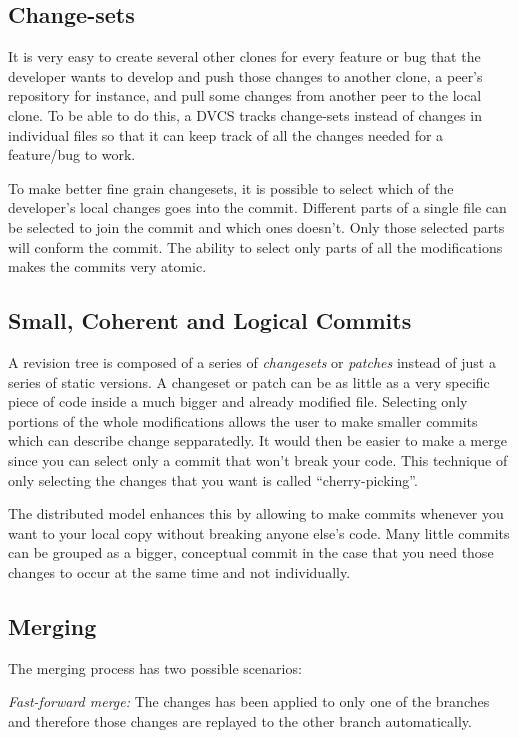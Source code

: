 \documentclass[a4paper,10pt]{article}
\begin{document}
\subsection{Change-sets}
It is very easy to create several other clones for every feature or bug that the developer wants to develop and push those changes to another clone, a peer's repository for instance, and pull some changes from another peer to the local clone. To be able to do this, a DVCS tracks change-sets instead of changes in individual files so that it can keep track of all the changes needed for a feature/bug to work.

To make better fine grain changesets, it is possible to select which of the developer's local changes goes into the commit.
Different parts of a single file can be selected to join the commit and which ones doesn't. 
Only those selected parts will conform the commit. The ability to select only parts of all the modifications makes the commits very atomic.


\subsection{Small, Coherent and Logical Commits}
A revision tree is composed of a series of \emph{changesets} or \emph{patches} instead of just a series of static versions. A changeset or patch
can be as little as a very specific piece of code inside a much bigger and already modified file. Selecting only portions of the whole modifications
allows the user to make smaller commits which can describe change sepparatedly. It would then be easier to make a merge since you can select
only a commit that won't break your code. This technique of only selecting the changes that you want is called ``cherry-picking''.

The distributed model enhances this by allowing to make commits whenever you want to your local copy without breaking anyone else's code. Many little commits can be grouped as a bigger, conceptual commit in the case that you need those changes to occur at the same time and not individually. 

\subsection{Merging}
The merging process has two possible scenarios:

\emph{Fast-forward merge:} The changes has been applied to only one of the branches and therefore those changes are replayed to the other branch automatically.
\end{document}
